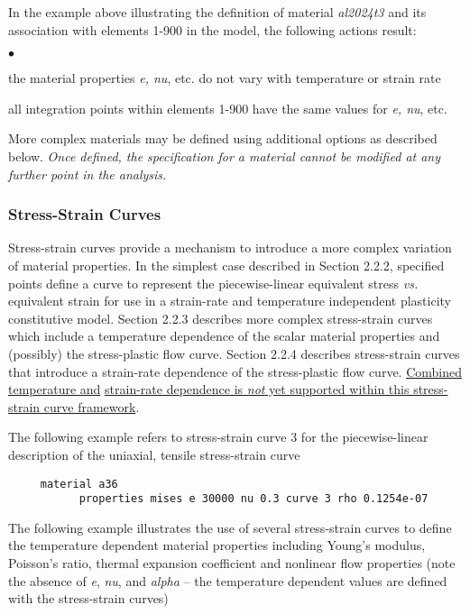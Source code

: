 \documentclass[11pt]{report}
\numberwithin{equation}{section}
\newcommand{\ul} {\underline}
\newcommand{\ti}{\emph}
\newcommand{\squishlist}{
 \begin{list}{$\bullet$}
  { \setlength{\itemsep}{0pt}
     \setlength{\parsep}{3pt}
     \setlength{\topsep}{3pt}
     \setlength{\partopsep}{0pt}
     \setlength{\leftmargin}{1.5em}
     \setlength{\labelwidth}{1em}
     \setlength{\labelsep}{0.5em} } }
\newcommand{\squishend}{
  \end{list}  }
\begin{document}
In the example above illustrating the definition of material \ti{al2024t3} and its
association with elements 1-900 in the model, the following actions result:

\small \squishlist
\item
the material properties \ti{e, nu}, etc. do not vary with temperature or
strain rate
\item
all integration points within elements 1-900 have the same
values for  \ti{e, nu}, etc.
\squishend \normalsize

More complex materials may be defined using additional options as described
below. \ti{Once defined, the specification for a material cannot be modified at any
further point in the analysis.}

\subsubsection{Stress-Strain Curves}
Stress-strain curves provide a mechanism to introduce a more complex variation
of material properties. In the simplest case described in Section 2.2.2,
specified points define a curve to represent the piecewise-linear equivalent
stress \ti{vs.} equivalent strain for use in a strain-rate and temperature
independent plasticity constitutive model. Section 2.2.3 describes more complex
stress-strain curves which include a temperature dependence of the scalar 
material properties and (possibly) the  stress-plastic flow curve. Section 2.2.4 describes
stress-strain curves that introduce a strain-rate dependence of the
stress-plastic flow curve. \ul{Combined temperature and}
\ul{strain-rate dependence is
\ti{not} yet supported within this stress-strain curve framework}.

The following example refers to stress-strain curve 3 for the piecewise-linear
description of the uniaxial, tensile stress-strain curve

\small
\begin{verbatim}
     material a36
           properties mises e 30000 nu 0.3 curve 3 rho 0.1254e-07
\end{verbatim}
\normalsize

The following example illustrates the use of several stress-strain curves to
define the temperature dependent material properties including Young's modulus,
Poisson's ratio, thermal expansion coefficient and nonlinear flow properties
(note the absence of \ti{e}, \ti{nu}, and \ti{alpha} -- the temperature dependent values are
defined with the stress-strain curves)
\end{document}
